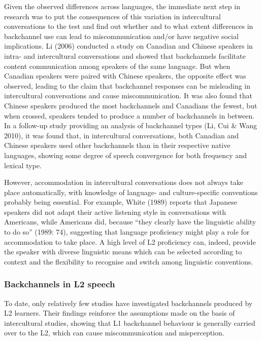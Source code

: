 \begin{styleStandard}
Given the observed differences across languages, the immediate next step in research was to put the consequences of this variation in intercultural conversations to the test and find out whether and to what extent differences in backchannel use can lead to miscommunication and/or have negative social implications. Li (2006) conducted a study on Canadian and Chinese speakers in intra- and intercultural conversations and showed that backchannels facilitate content communication among speakers of the same language. But when Canadian speakers were paired with Chinese speakers, the opposite effect was observed, leading to the claim that backchannel responses can be misleading in intercultural conversations and cause miscommunication. It was also found that Chinese speakers produced the most backchannels and Canadians the fewest, but when crossed, speakers tended to produce a number of backchannels in between. In a follow-up study providing an analysis of backchannel types (Li, Cui \& Wang 2010), it was found that, in intercultural conversations, both Canadian and Chinese speakers used other backchannels than in their respective native languages, showing some degree of speech convergence for both frequency and lexical type.
\end{styleStandard}

\begin{styleStandard}
However, accommodation in intercultural conversations does not always take place automatically, with knowledge of language- and culture-specific conventions probably being essential. For example, White (1989) reports that Japanese speakers did not adapt their active listening style in conversations with Americans, while Americans did, because “they clearly have the linguistic ability to do so” (1989: 74), suggesting that language proficiency might play a role for accommodation to take place. A high level of L2 proficiency can, indeed, provide the speaker with diverse linguistic means which can be selected according to context and the flexibility to recognise and switch among linguistic conventions.
\end{styleStandard}

\subsubsection{Backchannels in L2 speech}
\hypertarget{Toc191305946}{}\begin{styleStandard}
To date, only relatively few studies have investigated backchannels produced by L2 learners. Their findings reinforce the assumptions made on the basis of intercultural studies, showing that L1 backchannel behaviour is generally carried over to the L2, which can cause miscommunication and misperception.
\end{styleStandard}

